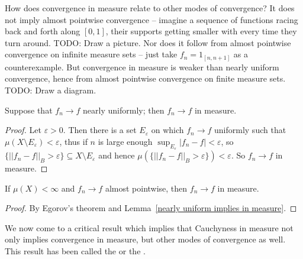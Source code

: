 \begin{subsec}
How does convergence in measure relate to other modes of convergence?
It does not imply almost pointwise convergence -- imagine a sequence of functions racing back and forth along $[0, 1]$, their supports getting smaller with every time they turn around. TODO: Draw a picture.
Nor does it follow from almost pointwise convergence on infinite measure sets -- just take $f_{n} = 1_{[n, n+1]}$ as a counterexample.
But convergence in measure is weaker than nearly uniform convergence, hence from almost pointwise convergence on finite measure sets. TODO: Draw a diagram.
\end{subsec}

\begin{lemma}
\label{nearly uniform implies in measure}
Suppose that $f_{n} \to f$ nearly uniformly; then $f_{n} \to f$ in measure.
\end{lemma}
\begin{proof}
Let $\varepsilon > 0$.
Then there is a set $E_\varepsilon$ on which $f_{n} \to f$ uniformly such that $\mu(X \setminus E_\varepsilon) < \varepsilon$, thus if $n$ is large enough $\sup_{E_\varepsilon} |f_{n} - f| < \varepsilon$, so $\{||f_{n} - f||_{B} > \varepsilon\} \subseteq X \setminus E_\varepsilon$ and hence $\mu(\{||f_{n} - f||_{B} > \varepsilon\}) < \varepsilon$.
So $f_{n} \to f$ in measure.
\end{proof}

\begin{corollary}
If $\mu(X) < \infty$ and $f_{n} \to f$ almost pointwise, then $f_{n} \to f$ in measure.
\end{corollary}
\begin{proof}
By Egorov's theorem and Lemma~\ref{nearly uniform implies in measure}.
\end{proof}

\begin{subsec}
We now come to a critical result which implies that Cauchyness in measure not only implies convergence in measure, but other modes of convergence as well.
This result has been called the  or the .
\end{subsec}

